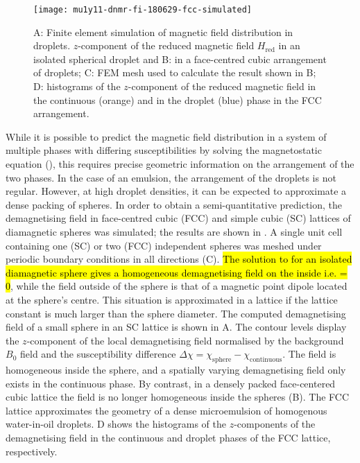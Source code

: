 \begin{figure}[ht]
  \begin{center}
    \texttt{[image: mu1y11-dnmr-fi-180629-fcc-simulated]}
  \end{center}
  \caption{A: Finite element simulation of magnetic field distribution in droplets.
      $z$-component of the reduced magnetic field $H_\text{red}$ in an isolated spherical droplet
      and B: in a face-centred cubic arrangement of droplets; C: FEM mesh used
      to calculate the result shown in B; D: histograms of the $z$-component
      of the reduced magnetic field in the continuous (orange) and in the droplet (blue) phase
      in the FCC arrangement.
    }
  \label{fig:FEM-fcc}
\end{figure}


While it is possible to predict the magnetic field distribution in a system of
multiple phases with differing susceptibilities by solving the magnetostatic
equation (), this requires precise geometric information on the arrangement of the
two phases. In the case of an emulsion, the arrangement of the droplets is not
regular. However, at high droplet densities, it can be
expected to approximate  a dense packing of spheres. In order to obtain a
semi-quantitative prediction, the demagnetising field in
face-centred cubic  (FCC) and simple cubic (SC) lattices of diamagnetic spheres was simulated;
the results are shown in  . A single unit cell containing
one (SC) or
two (FCC) independent spheres was meshed under periodic boundary conditions in all
directions (C).
\hl{The solution to  for an isolated diamagnetic sphere gives a
homogeneous demagnetising field on the inside i.e.  = $0$}, while the field outside of the
sphere is that of a magnetic
point dipole located at the sphere's centre. This situation is approximated
in a lattice if the lattice constant is much larger than the sphere
diameter. The computed demagnetising field
of a small sphere in an SC lattice is shown in A.
The contour levels display the $z$-component of the local demagnetising field
normalised by the background $B_0$ field and the susceptibility difference
$\Delta\chi= \chi_\text{sphere}-\chi_\text{continuous}$. The field is homogeneous
inside the sphere, and a spatially varying demagnetising field only
exists in the continuous phase.
By contrast, in a
densely packed face-centered cubic lattice the field is no
longer homogeneous inside the spheres (B). The FCC
lattice approximates the geometry of a dense microemulsion of homogenous
water-in-oil droplets.  D shows the histograms of
the $z$-components of
the demagnetising field in the continuous and droplet phases of the FCC
lattice, respectively.


